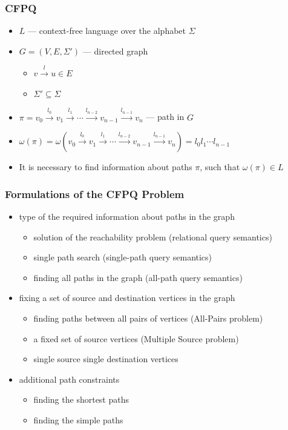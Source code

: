 \documentclass[xcolor=table,aspectratio=169]{beamer}
\begin{document}
\begin{frame}[fragile]
	\frametitle{CFPQ}
	\begin{itemize}
		\item $L$ --- context-free language over the alphabet $\Sigma$
		\pause
		\item $G = (V,E,\Sigma')$ --- directed graph
		\begin{itemize}
			\item $v \xrightarrow{l} u \in E$
			\item $\Sigma' \subseteq \Sigma$
		\end{itemize}
		\pause
		\item $\pi = v_0 \xrightarrow{l_0} v_1 \xrightarrow{l_1} \cdots \xrightarrow{l_{n-2}} v_{n-1} \xrightarrow{l_{n-1}} v_n$ --- path in $G$
		\item $\omega(\pi) = \omega(v_0 \xrightarrow{l_0} v_1 \xrightarrow{l_1} \cdots \xrightarrow{l_{n-2}} v_{n-1} \xrightarrow{l_{n-1}} v_n) = l_0 l_1 \cdots l_{n-1}$
		\pause
		\item It is necessary to find information about paths $\pi$, such that $\omega(\pi) \in L$
	\end{itemize}
\end{frame}

\begin{frame}[fragile] \frametitle{Formulations of the CFPQ Problem}
	\begin{itemize}
		\item type of the required information about paths in the graph \begin{itemize}
			\item solution of the reachability problem (relational query semantics)
			\item single path search (single-path query semantics)
			\item finding all paths in the graph (all-path query semantics)
		\end{itemize}
		\item fixing a set of source and destination vertices in the graph
		\begin{itemize}
			\item finding paths between all pairs of vertices (All-Pairs problem)
			\item a fixed set of source vertices (Multiple Source problem)
			\item single source single destination vertices
		\end{itemize}
		\item additional path constraints
		\begin{itemize}
			\item finding the shortest paths
			\item finding the simple paths
		\end{itemize}
	\end{itemize}
\end{frame}
\end{document}
